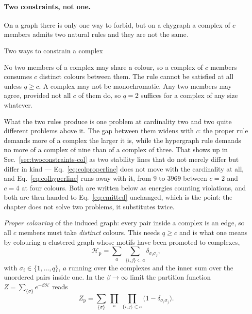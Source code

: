 \paragraph{Two constraints, not one.} On a graph there is only one way to
forbid, but on a chygraph a complex of $c$ members admits two natural rules and
they are not the same.

\begin{model}{Two ways to constrain a complex}
\begin{rules}
 No two members of a complex may share a colour, so a complex of
$c$ members consumes $c$ distinct colours between them. The rule cannot be
satisfied at all unless $q\ge c$.
 A complex may not be monochromatic. Any two members may
agree, provided not all $c$ of them do, so $q=2$ suffices for a complex of any
size whatever.
\end{rules}
\end{model}

What the two rules produce is one problem at cardinality two and two quite
different problems above it. The gap between them widens with $c$: the proper
rule demands more of a complex the larger it is, while the hypergraph rule
demands no more of a complex of nine than of a complex of three. That shows up
in Sec.~\ref{sec:twoconstraints-col} as two stability lines that do not merely
differ but differ in kind --- Eq.~\eqref{eq:colproperline} does not move with
the cardinality at all, and Eq.~\eqref{eq:colhyperline} runs away with it, from
$9$ to $3969$ between $c=2$ and $c=4$ at four colours. Both are written below as energies
counting violations, and both are then handed to Eq.~\eqref{eq:emitted}
unchanged, which is the point: the chapter does not solve two problems, it
substitutes twice.

\emph{Proper colouring} of the induced graph: every pair inside a complex is an
edge, so all $c$ members must take \emph{distinct} colours. This needs $q\ge c$
and is what one means by colouring a clustered graph whose motifs have been
promoted to complexes,
\begin{equation}
  \mathcal{H}_{\mathrm{p}}=\sum_{a}\ \sum_{\{i,j\}\subset a}
     \delta_{\sigma_{i}\sigma_{j}},
  \label{eq:colHp}
\end{equation}
with $\sigma_{i}\in\{1,\dots,q\}$, $a$ running over the complexes and the inner
sum over the unordered pairs inside one. In the $\beta\to\infty$ limit the
partition function $Z=\sum_{\{\sigma\}}e^{-\beta\mathcal{H}}$ reads
\begin{equation}
  Z_{\mathrm{p}}=\sum_{\{\sigma\}}\ \prod_{a}\ \prod_{\{i,j\}\subset a}
     \bigl(1-\delta_{\sigma_{i}\sigma_{j}}\bigr).
  \label{eq:colZp}
\end{equation}

